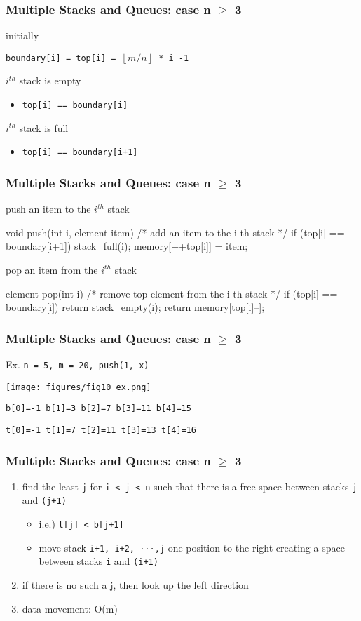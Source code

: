 \documentclass[newPxFont,sthlmFooter,nooffset]{beamer}
\begin{document}
\begin{frame}[t]
  \frametitle{Multiple Stacks and Queues: case n $\geq$ 3}
initially

\texttt{boundary[i] = top[i] = $\left\lfloor m/n\right\rfloor$ * i -1}

$i^{th}$ stack is empty
\begin{itemize}
\item \texttt{top[i] == boundary[i]}
\end{itemize}

$i^{th}$ stack is full
\begin{itemize}
\item \texttt{top[i] == boundary[i+1]}
\end{itemize}

\end{frame}

\begin{frame}[t, fragile]
  \frametitle{Multiple Stacks and Queues: case n $\geq$ 3}
push an item to the $i^{th}$ stack
\begin{ncodedef}
void push(int i, element item) { 
    /* add an item to the i-th stack */
    if (top[i] == boundary[i+1]) 
        stack_full(i);
    memory[++top[i]] = item; 
}    
\end{ncodedef}
\bigskip
pop an item from the $i^{th}$ stack
\begin{ncodedef}
element pop(int i) {
    /* remove top element from the i-th stack */
    if (top[i] == boundary[i]) 
        return stack_empty(i);
    return memory[top[i]--]; 
}
\end{ncodedef}
\end{frame}

\begin{frame}[t]
  \frametitle{Multiple Stacks and Queues: case n $\geq$ 3}
Ex. \texttt{n = 5, m = 20, push(1, x)}

\begin{center}
  \texttt{[image: figures/fig10\_ex.png]}
\end{center}
\bigskip
\texttt{b[0]=-1 b[1]=3 b[2]=7 b[3]=11 b[4]=15}

\texttt{t[0]=-1 t[1]=7 t[2]=11 t[3]=13 t[4]=16}
\end{frame}

\begin{frame}[t]
  \frametitle{Multiple Stacks and Queues: case n $\geq$ 3}
  \begin{enumerate}
  \item find the least \texttt{j} for \texttt{i < j < n} such that there is a free space between stacks \texttt{j} and \texttt{(j+1)}
    \begin{itemize}
    \item i.e.) \texttt{t[j] < b[j+1]}
    \item move stack \texttt{i+1, i+2, ···,j} one position to the
      right creating a space between stacks \texttt{i} and
      \texttt{(i+1)}
    \end{itemize}
  \item if there is no such a j, then look up the left direction
  \item data movement: O(m)
  \end{enumerate}
\end{frame}
\end{document}
